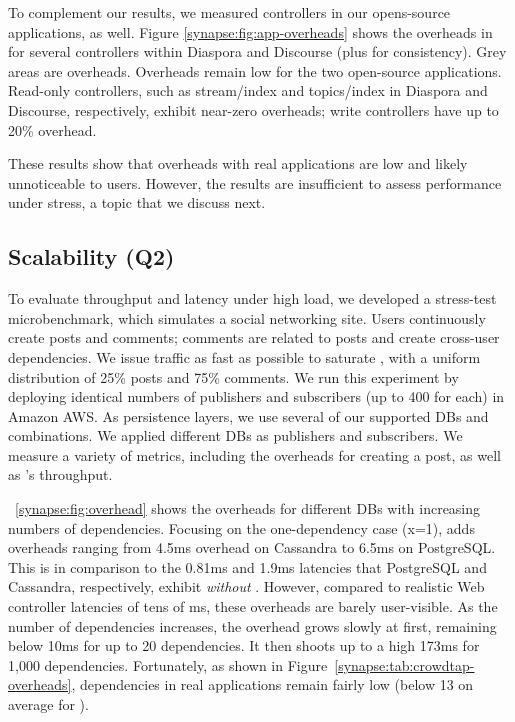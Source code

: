 To complement our \crowdtap results, we measured controllers in our opens-source
applications, as well. Figure \ref{synapse:fig:app-overheads} shows the \synapse
overheads in for several controllers within Diaspora and Discourse (plus
\crowdtap for consistency). Grey areas are \synapse overheads. Overheads
remain low for the two open-source applications. Read-only controllers, such as
{\code stream/index} and {\code topics/index} in Diaspora and Discourse,
respectively, exhibit near-zero overheads; write controllers have up to 20\%
overhead.

These results show that \synapse overheads with real applications are low and
likely unnoticeable to users. However, the results are insufficient to assess
performance under stress, a topic that we discuss next.

\subsection{Scalability (Q2)}
\label{synapse:sec:evaluation:scalability}

To evaluate \synapse throughput and latency under high load, we developed a
stress-test microbenchmark, which simulates a social networking site. Users
continuously create posts and comments; comments are related to posts and create
cross-user dependencies. We issue traffic as fast as possible to saturate \synapse, with a
uniform distribution of 25\% posts and 75\% comments. We run this experiment
by deploying identical numbers of publishers and subscribers (up to 400 for
each) in Amazon AWS. As persistence layers, we use several of our supported
DBs and combinations. We applied different DBs as publishers and
subscribers. We measure a variety of metrics, including the overheads for
creating a post, as well as \synapse's throughput.

\F~\ref{synapse:fig:overhead} shows the overheads for different DBs with increasing
numbers of dependencies. Focusing on the one-dependency case (x=1), \synapse
adds overheads ranging from 4.5ms overhead on Cassandra to 6.5ms on PostgreSQL.
This is in comparison to the 0.81ms and 1.9ms latencies that PostgreSQL and
Cassandra, respectively, exhibit {\em without} \synapse. However, compared to
realistic Web controller latencies of tens of ms, these overheads are barely
user-visible. As the number of dependencies increases, the overhead grows slowly
at first, remaining below 10ms for up to 20 dependencies. It then shoots up to a
high 173ms for 1,000 dependencies. Fortunately, as shown in
Figure~\ref{synapse:tab:crowdtap-overheads}, dependencies in real applications remain
fairly low (below 13 on average for \crowdtap).

